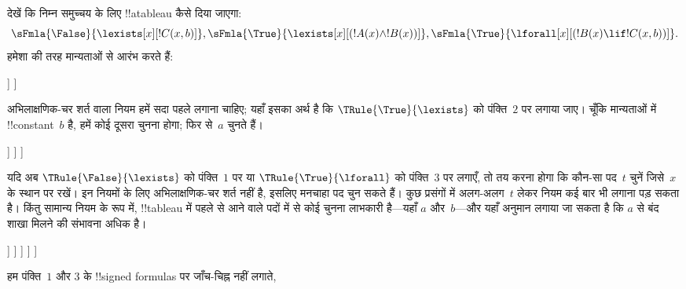 \documentclass[../../../include/open-logic-section]{subfiles}
\begin{document}
\begin{ex}
देखें कि निम्न समुच्चय के लिए !!a{tableau} कैसे दिया जाएगा:
\[
\sFmla{\False}{\lexists[x][!C(x,b)]},
\sFmla{\True}{\lexists[x][(!A(x) \land !B(x))]},
\sFmla{\True}{\lforall[x][(!B(x) \lif !C(x,b))]}.
\]
हमेशा की तरह मान्यताओं से आरंभ करते हैं:
\begin{oltableau}
  [\sFmla{\False}{\lexists[x][\formula{C}(x,b)]}, just=\TAss
    [\sFmla{\True}{\lexists[x][(\formula{A}(x) \land \formula{B}(x))]},
      just=\TAss
      [\sFmla{\True}{\lforall[x][(\formula{B}(x) \lif \formula{C}(x,b))]},
        just=\TAss]
    ]
  ]
\end{oltableau}
अभिलाक्षणिक-चर शर्त वाला नियम हमें सदा पहले लगाना चाहिए; यहाँ इसका अर्थ है
कि $\TRule{\True}{\lexists}$ को पंक्ति~$2$ पर लगाया जाए। चूँकि मान्यताओं में
!!{constant}~$b$ है, हमें कोई दूसरा चुनना होगा; फिर से~$a$ चुनते हैं।
\begin{oltableau}
  [\sFmla{\False}{\lexists[x][\formula{C}(x,b)]}, just=\TAss
    [\sFmla{\True}{\lexists[x][(\formula{A}(x) \land \formula{B}(x))]},
      just=\TAss, checked
      [\sFmla{\True}{\lforall[x][(\formula{B}(x) \lif \formula{C}(x,b))]},
        just=\TAss
        [\sFmla{\True}{\formula{A}(a) \land \formula{B}(a)},
          just={\TRule{\True}{\lexists}[2]}]
      ]
    ]
  ]
\end{oltableau}
यदि अब $\TRule{\False}{\lexists}$ को पंक्ति~$1$ पर या
$\TRule{\True}{\lforall}$ को पंक्ति~$3$ पर लगाएँ, तो तय करना होगा कि कौन-सा
पद~$t$ चुनें जिसे~$x$ के स्थान पर रखें। इन नियमों के लिए अभिलाक्षणिक-चर शर्त नहीं है, इसलिए मनचाहा पद
चुन सकते हैं। कुछ प्रसंगों में अलग-अलग~$t$ लेकर नियम कई बार भी लगाना पड़
सकता है। किंतु सामान्य नियम के रूप में, !!{tableau} में पहले से आने वाले
पदों में से कोई चुनना लाभकारी है---यहाँ $a$ और~$b$---और यहाँ अनुमान लगाया
जा सकता है कि $a$ से बंद शाखा मिलने की संभावना अधिक है।
\begin{oltableau}
  [\sFmla{\False}{\lexists[x][\formula{C}(x,b)]}, just=\TAss
    [\sFmla{\True}{\lexists[x][(\formula{A}(x) \land \formula{B}(x))]},
      just=\TAss, checked
      [\sFmla{\True}{\lforall[x][(\formula{B}(x) \lif \formula{C}(x,b))]}, just=\TAss
        [\sFmla{\True}{\formula{A}(a) \land \formula{B}(a)}, just={\TRule{\True}{\lexists}[2]}
          [\sFmla{\False}{\formula{C}(a,b)}, just={\TRule{\False}{\lexists}[1]}
            [\sFmla{\True}{\formula{B}(a) \lif \formula{C}(a,b)},
              just={\TRule{\True}{\lforall}[3]}
            ]
          ]
        ]
      ]
    ]
  ]
\end{oltableau}
हम पंक्ति~$1$ और $3$ के !!{signed formula}s पर जाँच-चिह्न नहीं लगाते,

\end{ex}
\end{document}
